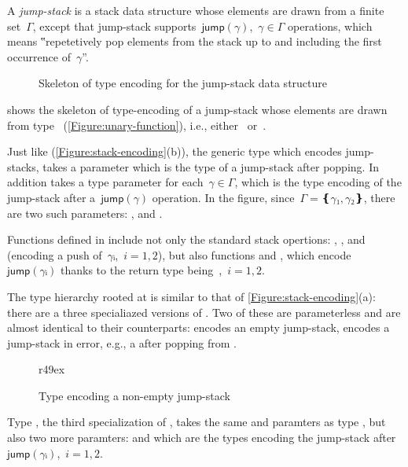 A \emph{jump-stack} is a stack data structure whose elements are drawn from a finite set~$Γ$,
  except that jump-stack supports~$\textsf{jump}(γ)$,~$γ∈Γ$ operations,
    which means
  ‟repetetively pop elements from the stack up to and including the first occurrence of~$γ$”.

\begin{wrapfigure}[16]{r}{42ex}
  \caption{Skeleton of type encoding for the jump-stack data structure}%
  \label{Figure:jump}%
\end{wrapfigure}

 shows the skeleton of type-encoding of a jump-stack whose
elements are drawn from type~
(\cref{Figure:unary-function}), i.e., either~ or~.

Just like  (\cref{Figure:stack-encoding}(b)),
  the generic type  which encodes jump-stacks, takes
  a  parameter which is the type of a jump-stack after popping.
  In addition  takes a type parameter for each~$γ∈Γ$,
  which is the type encoding of the jump-stack after a~$\textsf{jump}(γ)$
  operation.
In the figure, since~$Γ=❴γ₁,γ₂❵$, there are two such parameters:
  , and
  .

Functions defined in  include not only the standard stack opertions: ,
,  and~ (encoding a push of~$γᵢ$,~$i=1,2$),
  but also functions  and ,
  which encode~$\textsf{jump}(γᵢ)$
  thanks to the return type being~,~$i=1,2$.

The type hierarchy rooted at  is similar to that of
\cref{Figure:stack-encoding}(a):
  there are a three specialiazed versions of .
  Two of these are parameterless and are
  almost identical to their 
  counterparts:
 encodes an empty jump-stack,  encodes a jump-stack in error,
e.g., a after popping from .

\begin{wrapfigure}[7]r{49ex}
  \caption{\label{Figure:jump-stack-push} Type  encoding a non-empty jump-stack}
\end{wrapfigure}

Type , the third specialization of ,
  takes the same  and  paramters as type ,
  but also two more paramters:
 and 
which are the types encoding the jump-stack
  after~$\textsf{jump}(γᵢ)$,~$i=1,2$.

